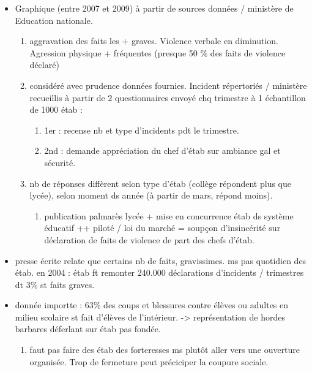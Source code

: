 \documentclass[12pt]{report}
\begin{document}
\begin{itemize}
\begin{itemize}
\item Graphique (entre 2007 et 2009) à partir de sources données / ministère de Education nationale.
\begin{enumerate}
\item aggravation des faits les + graves. Violence verbale en diminution. Agression physique + fréquentes (presque 50 \% des faits de violence déclaré) \\
\item considéré avec prudence données fournies. Incident répertoriés / ministère recueillis à partir de 2 questionnaires envoyé chq trimestre à 1 échantillon de 1000 étab : 
\begin{enumerate}
\item 1er : recense nb et type d'incidents pdt le trimestre.\\
\item 2nd : demande appréciation du chef d'étab sur ambiance gal et sécurité.\\
\end{enumerate}

\item nb de réponses diffèrent selon type d'étab (collège répondent plus que lycée), selon moment ds année (à partir de mars, répond moins). \\
\begin{enumerate}
\item publication palmarès lycée + mise en concurrence étab ds système éducatif ++ piloté / loi du marché = soupçon d'insincérité sur déclaration de faits de violence de part des chefs d'étab.\\
\end{enumerate}

\end{enumerate}

\item presse écrite relate que certains nb de faits, gravissimes. ms pas quotidien des étab. en 2004 :  étab ft remonter 240.000 déclarations d'incidents / trimestres dt 3\% st faits graves.\\

\item donnée importte :  63\% des coups et blessures contre élèves ou adultes en milieu scolaire st fait d'élèves de l'intérieur. -> représentation de hordes barbares déferlant sur étab pas fondée.\\
\begin{enumerate}
\item faut pas faire des étab des forteresses ms plutôt aller vers une ouverture organisée. Trop de fermeture peut préciciper la coupure sociale.\\
\end{enumerate}


\end{itemize}
\end{itemize}
\end{document}
